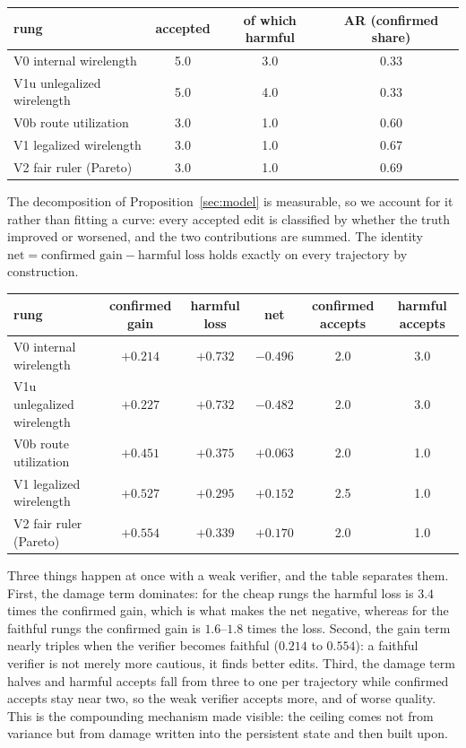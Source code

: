 \documentclass{article}
\begin{document}
\begin{center}
\begin{tabular}{lccc}
\toprule
rung & accepted & of which harmful & AR (confirmed share) \\
\midrule
V0 internal wirelength & 5.0 & 3.0 & 0.33 \\
V1u unlegalized wirelength & 5.0 & 4.0 & 0.33 \\
V0b route utilization & 3.0 & 1.0 & 0.60 \\
V1 legalized wirelength & 3.0 & 1.0 & 0.67 \\
V2 fair ruler (Pareto) & 3.0 & 1.0 & 0.69 \\
\bottomrule
\end{tabular}
\end{center}

The decomposition of Proposition~\ref{sec:model} is measurable, so we account for it
rather than fitting a curve: every accepted edit is classified by whether the truth
improved or worsened, and the two contributions are summed. The identity
$\text{net} = \text{confirmed gain} - \text{harmful loss}$ holds exactly on every
trajectory by construction.

\begin{center}
\begin{tabular}{lccccc}
\toprule
rung & confirmed gain & harmful loss & net & confirmed accepts & harmful accepts \\
\midrule
V0 internal wirelength & $+0.214$ & $\mathbf{+0.732}$ & $\mathbf{-0.496}$ & 2.0 & 3.0 \\
V1u unlegalized wirelength & $+0.227$ & $\mathbf{+0.732}$ & $\mathbf{-0.482}$ & 2.0 & 3.0 \\
V0b route utilization & $+0.451$ & $+0.375$ & $+0.063$ & 2.0 & 1.0 \\
V1 legalized wirelength & $+0.527$ & $+0.295$ & $+0.152$ & 2.5 & 1.0 \\
V2 fair ruler (Pareto) & $+0.554$ & $+0.339$ & $+0.170$ & 2.0 & 1.0 \\
\bottomrule
\end{tabular}
\end{center}

Three things happen at once with a weak verifier, and the table separates them.
First, the damage term dominates: for the cheap rungs the harmful loss is $3.4$ times
the confirmed gain, which is what makes the net negative, whereas for the faithful
rungs the confirmed gain is $1.6$--$1.8$ times the loss. Second, the gain term nearly
triples when the verifier becomes faithful ($0.214$ to $0.554$): a faithful verifier is
not merely more cautious, it finds better edits. Third, the damage term halves and
harmful accepts fall from three to one per trajectory while confirmed accepts stay near
two, so the weak verifier accepts more, and of worse quality. This is the compounding
mechanism made visible: the ceiling comes not from variance but from damage written into
the persistent state and then built upon.
\end{document}
